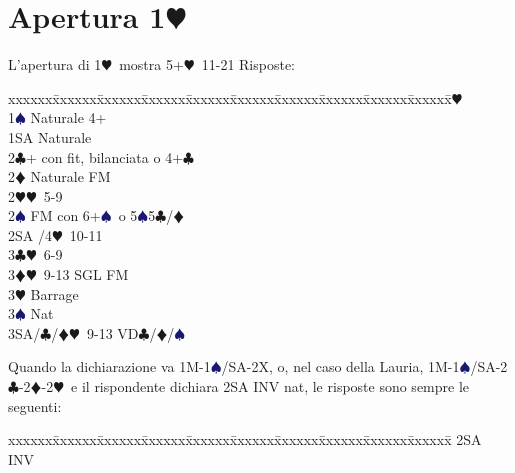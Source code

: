 \documentclass[a4paper,italian]{article}
\newcommand{\BC}{\textcolor{OliveGreen}{$\clubsuit$}}
\newcommand{\BD}{\textcolor{RedOrange}{$\vardiamondsuit$}}
\newcommand{\BH}{\textcolor{Red2}{$\varheartsuit${}}}
\newcommand{\BS}{\textcolor{MidnightBlue}{$\spadesuit${}}}
\newcommand{\pdfh}{\texorpdfstring{\BH{}}{H}}
\newenvironment{bidtable}
{\begin{tabbing}

    xxxxxx\=xxxxxx\=xxxxxx\=xxxxxx\=xxxxxx\=xxxxxx\=xxxxxx\=xxxxxx\=xxxxxx\=xxxxxx\=\kill}
{\end{tabbing} }%
\newenvironment{sviluppi}
{\begin{tcolorbox}[colframe=azzurro,title=Sviluppi particolari]}
    {
\end{tcolorbox} }%
\begin{document}
                                    \section{Apertura 1\pdfh}
                                    \begin{multicols*}{2}
                                        L'apertura di 1\BH\ mostra 5+\BH\ 11-21
                                        Risposte:
                                        \begin{bidtable}
                                            1\BH\+\\
                                            1\BS \>\> Naturale 4+\\
                                            1SA \>\> Naturale\\
                                            2\BC \>+ con fit, bilanciata o 4+\BC \\
                                            2\BD \>\> Naturale FM\\
                                            2\BH \>\BH\ 5-9\\
                                            2\BS \>\> FM con 6+\BS\ o 5\BS 5\BC /\BD \\
                                            2SA \>/4\BH\ 10-11\\
                                            3\BC \>\BH\ 6-9\\
                                            3\BD \>\BH\ 9-13 SGL FM\\
                                            3\BH \>\> Barrage\\
                                            3\BS \>\> Nat\\
                                            3SA/\BC/\BD \>\BH\ 9-13 VD\BC /\BD /\BS \-
                                        \end{bidtable}
                                        \begin{sviluppi}\label{1Maggiore}
                                            Quando la dichiarazione va 1M-1\BS/SA-2X, o, nel caso della Lauria, 1M-1\BS/SA-2\BC-2\BD-2\BH\ e il rispondente dichiara 2SA INV nat, le risposte sono sempre le seguenti:
                                            \smallbreak
                                            \begin{bidtable}
                                                2SA \> INV\+\\

\end{bidtable}
\end{sviluppi}
\end{multicols*}
\end{document}
